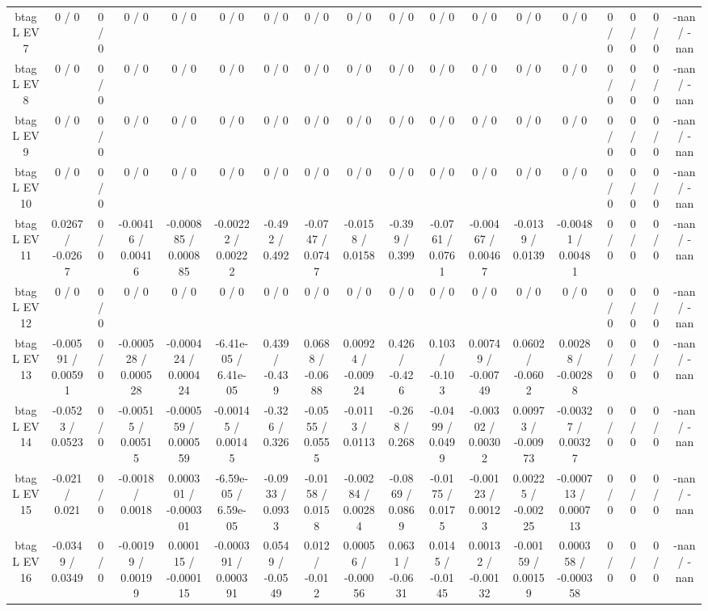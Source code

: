 \documentclass[10pt]{article}
\begin{document}
\begin{table}[htbp]
\begin{center}
\begin{tabular}{|c|c|c|c|c|c|c|c|c|c|c|c|c|c|c|c|c|c|}
  btag L EV 7 & 0 / 0 & 0 / 0 & 0 / 0 & 0 / 0 & 0 / 0 & 0 / 0 & 0 / 0 & 0 / 0 & 0 / 0 & 0 / 0 & 0 / 0 & 0 / 0 & 0 / 0 & 0 / 0 & 0 / 0 & 0 / 0 & -nan / -nan \\ 
  btag L EV 8 & 0 / 0 & 0 / 0 & 0 / 0 & 0 / 0 & 0 / 0 & 0 / 0 & 0 / 0 & 0 / 0 & 0 / 0 & 0 / 0 & 0 / 0 & 0 / 0 & 0 / 0 & 0 / 0 & 0 / 0 & 0 / 0 & -nan / -nan \\ 
  btag L EV 9 & 0 / 0 & 0 / 0 & 0 / 0 & 0 / 0 & 0 / 0 & 0 / 0 & 0 / 0 & 0 / 0 & 0 / 0 & 0 / 0 & 0 / 0 & 0 / 0 & 0 / 0 & 0 / 0 & 0 / 0 & 0 / 0 & -nan / -nan \\ 
  btag L EV 10 & 0 / 0 & 0 / 0 & 0 / 0 & 0 / 0 & 0 / 0 & 0 / 0 & 0 / 0 & 0 / 0 & 0 / 0 & 0 / 0 & 0 / 0 & 0 / 0 & 0 / 0 & 0 / 0 & 0 / 0 & 0 / 0 & -nan / -nan \\ 
  btag L EV 11 & 0.0267 / -0.0267 & 0 / 0 & -0.00416 / 0.00416 & -0.000885 / 0.000885 & -0.00222 / 0.00222 & -0.492 / 0.492 & -0.0747 / 0.0747 & -0.0158 / 0.0158 & -0.399 / 0.399 & -0.0761 / 0.0761 & -0.00467 / 0.00467 & -0.0139 / 0.0139 & -0.00481 / 0.00481 & 0 / 0 & 0 / 0 & 0 / 0 & -nan / -nan \\ 
  btag L EV 12 & 0 / 0 & 0 / 0 & 0 / 0 & 0 / 0 & 0 / 0 & 0 / 0 & 0 / 0 & 0 / 0 & 0 / 0 & 0 / 0 & 0 / 0 & 0 / 0 & 0 / 0 & 0 / 0 & 0 / 0 & 0 / 0 & -nan / -nan \\ 
  btag L EV 13 & -0.00591 / 0.00591 & 0 / 0 & -0.000528 / 0.000528 & -0.000424 / 0.000424 & -6.41e-05 / 6.41e-05 & 0.439 / -0.439 & 0.0688 / -0.0688 & 0.00924 / -0.00924 & 0.426 / -0.426 & 0.103 / -0.103 & 0.00749 / -0.00749 & 0.0602 / -0.0602 & 0.00288 / -0.00288 & 0 / 0 & 0 / 0 & 0 / 0 & -nan / -nan \\ 
  btag L EV 14 & -0.0523 / 0.0523 & 0 / 0 & -0.00515 / 0.00515 & -0.000559 / 0.000559 & -0.00145 / 0.00145 & -0.326 / 0.326 & -0.0555 / 0.0555 & -0.0113 / 0.0113 & -0.268 / 0.268 & -0.0499 / 0.0499 & -0.00302 / 0.00302 & 0.00973 / -0.00973 & -0.00327 / 0.00327 & 0 / 0 & 0 / 0 & 0 / 0 & -nan / -nan \\ 
  btag L EV 15 & -0.021 / 0.021 & 0 / 0 & -0.0018 / 0.0018 & 0.000301 / -0.000301 & -6.59e-05 / 6.59e-05 & -0.0933 / 0.0933 & -0.0158 / 0.0158 & -0.00284 / 0.00284 & -0.0869 / 0.0869 & -0.0175 / 0.0175 & -0.00123 / 0.00123 & 0.00225 / -0.00225 & -0.000713 / 0.000713 & 0 / 0 & 0 / 0 & 0 / 0 & -nan / -nan \\ 
  btag L EV 16 & -0.0349 / 0.0349 & 0 / 0 & -0.00199 / 0.00199 & 0.000115 / -0.000115 & -0.000391 / 0.000391 & 0.0549 / -0.0549 & 0.012 / -0.012 & 0.00056 / -0.00056 & 0.0631 / -0.0631 & 0.0145 / -0.0145 & 0.00132 / -0.00132 & -0.00159 / 0.00159 & 0.000358 / -0.000358 & 0 / 0 & 0 / 0 & 0 / 0 & -nan / -nan \\ 

\end{tabular}
\end{center}
\end{table}
\end{document}
